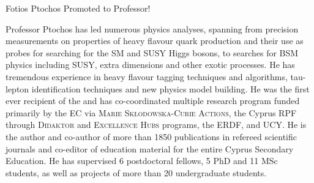 \begin{headline}[enhanced, tikz={rotate=0}, width=0.48\textwidth]{Fotios Ptochos Promoted to Professor!}
\begin{multicols}{2}
    Professor Ptochos has led numerous physics analyses, spanning
    from precision measurements on properties of heavy flavour quark
    production and their use as probes for searching for the SM and SUSY
    Higgs bosons, to searches for BSM physics including SUSY, extra
    dimensions and other exotic processes. He has tremendous experience in
    heavy flavour tagging techniques and algorithms, tau-lepton
    identification techniques and new physics model building. 
    He was the first ever recipient of the  and has co-coordinated multiple research program
    funded primarily by the EC via \textsc{Marie
    Skłodowska-Curie Actions}, the Cyprus RPF through
    \textsc{Didaktor} and \textsc{Excellence Hubs} programs, the ERDF,
    and UCY. He is the author and co-author of more than 
    1850 publications in refereed scientific journals and co-editor of
    education material for the entire Cyprus Secondary Education. He has
    supervised 6 postdoctoral fellows, 5
    PhD and 11 MSc students, as well as projects of more than 20
    undergraduate students.  
\end{multicols}
\end{headline}

